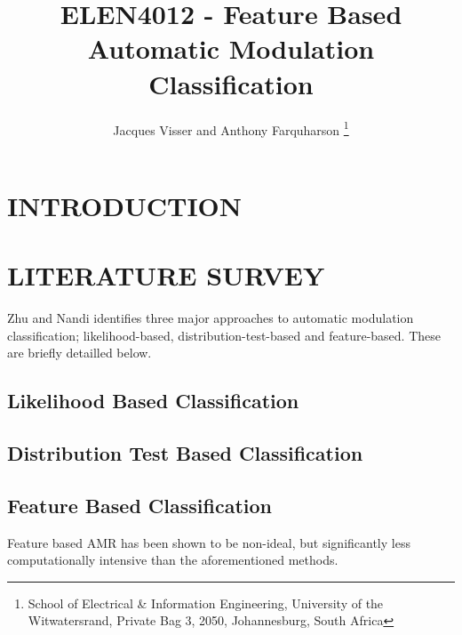 \documentclass[10pt,twocolumn]{witseiepaper}
\begin{document}
\title{ELEN4012 - Feature Based Automatic Modulation Classification}

\author{Jacques Visser and Anthony Farquharson
\thanks{School of Electrical \& Information Engineering, University of the
Witwatersrand, Private Bag 3, 2050, Johannesburg, South Africa}
}



\maketitle
\thispagestyle{empty}\pagestyle{empty}

\section{INTRODUCTION}

\section{LITERATURE SURVEY}
Zhu and Nandi \cite{zhu2014automatic} identifies three major approaches to automatic modulation classification; likelihood-based, distribution-test-based and feature-based. These are briefly detailled below.
	\subsection{Likelihood Based Classification}
	\subsection{Distribution Test Based Classification}
	\subsection{Feature Based Classification}
	Feature based AMR has been shown to be non-ideal, but significantly less computationally intensive \cite{zhu2014automatic} than the aforementioned methods.
\end{document}
